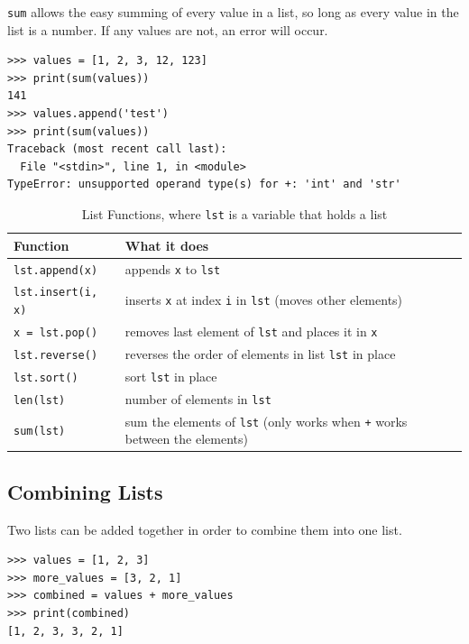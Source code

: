 \documentclass[11pt]{cselabheader}
\begin{document}
\lstinline{sum} allows the easy summing of every value in a list, so long as
every value in the list is a number. If any values are not, an error will occur.

\begin{lstlisting}[style=ipython]
>>> values = [1, 2, 3, 12, 123]
>>> print(sum(values))
141
>>> values.append('test')
>>> print(sum(values))
Traceback (most recent call last):
  File "<stdin>", line 1, in <module>
TypeError: unsupported operand type(s) for +: 'int' and 'str'
\end{lstlisting}

\begin{table}[!ht]
  \centering
  \begin{tabular}{ll}
    \toprule
    Function & What it does \\
    \midrule
    \lstinline!lst.append(x)! & appends \lstinline!x! to \lstinline!lst! \\
    \lstinline!lst.insert(i, x)! & inserts \lstinline!x! at index \lstinline!i!
    in \lstinline!lst! (moves other elements) \\
    \lstinline!x = lst.pop()! & removes last element of \lstinline!lst! and
    places it in \lstinline!x! \\
    \lstinline!lst.reverse()! & reverses the order of elements in list
    \lstinline!lst! in place\\
    \lstinline!lst.sort()! & sort \lstinline!lst! in place \\
    \lstinline!len(lst)! & number of elements in \lstinline!lst! \\
    \lstinline!sum(lst)! & sum the elements of \lstinline!lst! (only works when
    \lstinline!+! works between the elements)\\
    \bottomrule
  \end{tabular}
  \caption{List Functions, where \lstinline!lst! is a variable that holds a list}
  \label{tab:lists}
\end{table}

\subsection{Combining Lists}
Two lists can be added together in order to combine them into one list.

\begin{lstlisting}[style=ipython]
>>> values = [1, 2, 3]
>>> more_values = [3, 2, 1]
>>> combined = values + more_values
>>> print(combined)
[1, 2, 3, 3, 2, 1]
\end{lstlisting}
\end{document}

